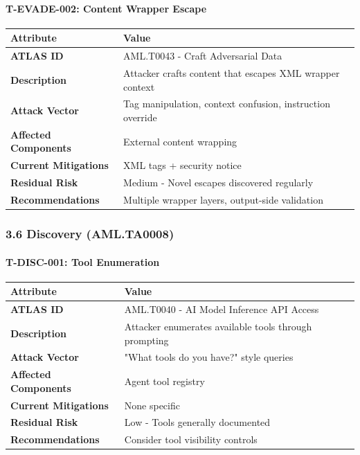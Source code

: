 \paragraph{T-EVADE-002: Content Wrapper Escape}



\begin{table}[h]
\centering
\small
\begin{tabular}{|l|l|}
\hline
Attribute & Value \\
\hline
\textbf{ATLAS ID} & AML.T0043 - Craft Adversarial Data \\
\hline
\textbf{Description} & Attacker crafts content that escapes XML wrapper context \\
\hline
\textbf{Attack Vector} & Tag manipulation, context confusion, instruction override \\
\hline
\textbf{Affected Components} & External content wrapping \\
\hline
\textbf{Current Mitigations} & XML tags + security notice \\
\hline
\textbf{Residual Risk} & Medium - Novel escapes discovered regularly \\
\hline
\textbf{Recommendations} & Multiple wrapper layers, output-side validation \\
\hline
\end{tabular}
\end{table}



\hrulefill


\subsubsection{3.6 Discovery (AML.TA0008)}


\paragraph{T-DISC-001: Tool Enumeration}



\begin{table}[h]
\centering
\small
\begin{tabular}{|l|l|}
\hline
Attribute & Value \\
\hline
\textbf{ATLAS ID} & AML.T0040 - AI Model Inference API Access \\
\hline
\textbf{Description} & Attacker enumerates available tools through prompting \\
\hline
\textbf{Attack Vector} & "What tools do you have?" style queries \\
\hline
\textbf{Affected Components} & Agent tool registry \\
\hline
\textbf{Current Mitigations} & None specific \\
\hline
\textbf{Residual Risk} & Low - Tools generally documented \\
\hline
\textbf{Recommendations} & Consider tool visibility controls \\
\hline
\end{tabular}
\end{table}



